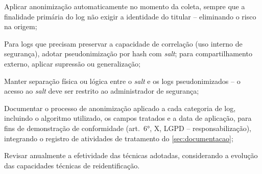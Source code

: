 \begin{alineas}
    \item Aplicar anonimização automaticamente no momento da coleta, sempre que a finalidade primária do log não exigir a identidade do titular -- eliminando o risco na origem;
    \item Para logs que precisam preservar a capacidade de correlação (uso interno de segurança), adotar pseudonimização por hash com \textit{salt}; para compartilhamento externo, aplicar supressão ou generalização;
    \item Manter separação física ou lógica entre o \textit{salt} e os logs pseudonimizados -- o acesso ao \textit{salt} deve ser restrito ao administrador de segurança;
    \item Documentar o processo de anonimização aplicado a cada categoria de log, incluindo o algoritmo utilizado, os campos tratados e a data de aplicação, para fins de demonstração de conformidade (art.\ 6°, X, LGPD -- responsabilização), integrando o registro de atividades de tratamento do \autoref{sec:documentacao};
    \item Revisar anualmente a efetividade das técnicas adotadas, considerando a evolução das capacidades técnicas de reidentificação.
\end{alineas}